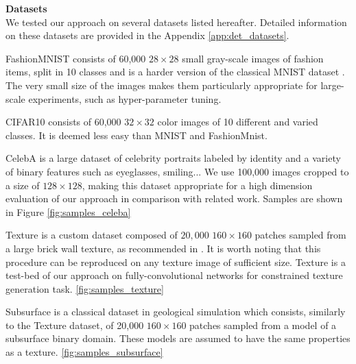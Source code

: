 \textbf{Datasets} \\
We tested our approach on several datasets listed hereafter. Detailed  information on these datasets are provided  in the Appendix \ref{app:det_datasets}.
\begin{description}
	\item{FashionMNIST} \citep{Xiao2017} consists of 60,000 $28\times 28$ small gray-scale images of fashion items, split in 10 classes and is a harder version of the classical MNIST  dataset \citep{LeCun1998a}. %
	The very small size of the images makes them particularly appropriate for large-scale experiments, such as hyper-parameter tuning. 
	
	\item{CIFAR10} \citep{Krizhevsky2009} consists of 60,000 $32 \times 32$ color images of 10 different and varied classes. It is deemed less easy than MNIST and FashionMnist.
	\item{CelebA} \citep{Liu2015} is a large dataset of celebrity portraits labeled by identity and a variety of binary features such as eyeglasses, smiling... We use 100,000 images cropped to a size of $128 \times 128$, making this dataset appropriate for a high dimension evaluation of our approach in comparison with related work. Samples are shown in Figure \ref{fig:samples_celeba}
	
	\item{Texture} is a custom dataset 
	composed of $20,000$ $160 \times 160$ patches sampled from a large brick wall texture, as recommended in \citep{Jetchev2017}. It is worth noting that this procedure can be reproduced on any texture image of sufficient size. Texture is a test-bed of our approach on fully-convolutional networks for constrained texture generation task. \ref{fig:samples_texture}
	
	\item{Subsurface} is a classical dataset in geological simulation \citep{Strebelle2002} which consists, similarly to the Texture dataset, of 20,000  $160 \times 160$ patches sampled from a model of a subsurface binary domain. These models are assumed to have the same properties as a texture.  \ref{fig:samples_subsurface}
	
	
\end{description}

